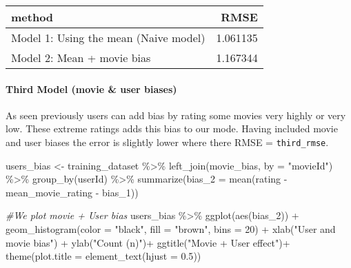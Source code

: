 \documentclass[
]{article}
\newenvironment{Shaded}{\begin{snugshade}}{\end{snugshade}}
\newcommand{\AttributeTok}[1]{\textcolor[rgb]{0.77,0.63,0.00}{#1}}
\newcommand{\CommentTok}[1]{\textcolor[rgb]{0.56,0.35,0.01}{\textit{#1}}}
\newcommand{\DecValTok}[1]{\textcolor[rgb]{0.00,0.00,0.81}{#1}}
\newcommand{\FloatTok}[1]{\textcolor[rgb]{0.00,0.00,0.81}{#1}}
\newcommand{\FunctionTok}[1]{\textcolor[rgb]{0.00,0.00,0.00}{#1}}
\newcommand{\NormalTok}[1]{#1}
\newcommand{\OtherTok}[1]{\textcolor[rgb]{0.56,0.35,0.01}{#1}}
\newcommand{\SpecialCharTok}[1]{\textcolor[rgb]{0.00,0.00,0.00}{#1}}
\newcommand{\StringTok}[1]{\textcolor[rgb]{0.31,0.60,0.02}{#1}}
\begin{document}
\begin{longtable}[]{@{}lr@{}}
\toprule
method & RMSE \\
\midrule
\endhead
Model 1: Using the mean (Naive model) & 1.061135 \\
Model 2: Mean + movie bias & 1.167344 \\
\bottomrule
\end{longtable}

\hypertarget{third-model-movie-user-biases}{%
\paragraph{Third Model (movie \& user
biases)}\label{third-model-movie-user-biases}}

As seen previously users can add bias by rating some movies very highly
or very low. These extreme ratings adds this bias to our mode. Having
included movie and user biases the error is slightly lower where there
RMSE = \texttt{third\_rmse}.

\begin{Shaded}
\begin{Highlighting}[]
\NormalTok{users\_bias }\OtherTok{\textless{}{-}}\NormalTok{ training\_dataset }\SpecialCharTok{\%\textgreater{}\%}
  \FunctionTok{left\_join}\NormalTok{(movie\_bias, }\AttributeTok{by =} \StringTok{"movieId"}\NormalTok{) }\SpecialCharTok{\%\textgreater{}\%}
  \FunctionTok{group\_by}\NormalTok{(userId) }\SpecialCharTok{\%\textgreater{}\%}
  \FunctionTok{summarize}\NormalTok{(}\AttributeTok{bias\_2 =} \FunctionTok{mean}\NormalTok{(rating }\SpecialCharTok{{-}}\NormalTok{ mean\_movie\_rating }\SpecialCharTok{{-}}\NormalTok{ bias\_1))}

\CommentTok{\#We plot movie + User bias}
\NormalTok{users\_bias }\SpecialCharTok{\%\textgreater{}\%} \FunctionTok{ggplot}\NormalTok{(}\FunctionTok{aes}\NormalTok{(bias\_2)) }\SpecialCharTok{+}
  \FunctionTok{geom\_histogram}\NormalTok{(}\AttributeTok{color =} \StringTok{"black"}\NormalTok{, }\AttributeTok{fill =} \StringTok{"brown"}\NormalTok{, }\AttributeTok{bins =} \DecValTok{20}\NormalTok{) }\SpecialCharTok{+}
  \FunctionTok{xlab}\NormalTok{(}\StringTok{"User and movie bias"}\NormalTok{) }\SpecialCharTok{+}
  \FunctionTok{ylab}\NormalTok{(}\StringTok{"Count (n)"}\NormalTok{)}\SpecialCharTok{+}
  \FunctionTok{ggtitle}\NormalTok{(}\StringTok{"Movie + User effect"}\NormalTok{)}\SpecialCharTok{+}
  \FunctionTok{theme}\NormalTok{(}\AttributeTok{plot.title =} \FunctionTok{element\_text}\NormalTok{(}\AttributeTok{hjust =} \FloatTok{0.5}\NormalTok{))}
\end{Highlighting}
\end{Shaded}
\end{document}
